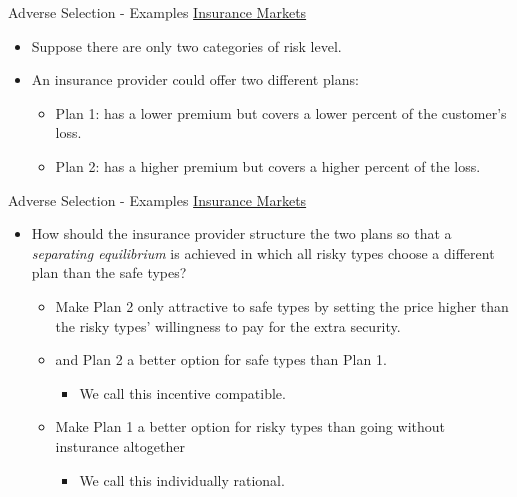 \begin{frame}{Adverse Selection - Examples}
  \underline{\Large{Insurance Markets}}
  \begin{itemize}
    \item Suppose there are only two categories of risk level.
    \item An insurance provider could offer two different plans:
    \begin{itemize}
      \item Plan 1: has a lower premium
      but covers a lower percent of the customer's loss.
      \item Plan 2: has a higher premium 
      but covers a higher percent of the loss.
    \end{itemize}
  \end{itemize}
\end{frame}


\begin{frame}{Adverse Selection - Examples}
  \underline{\Large{Insurance Markets}}
  \begin{itemize}
    \item How should the insurance provider structure the two plans 
    so that a \textit{separating equilibrium} is achieved 
    in which all risky types choose a different plan than the safe types?
    \begin{itemize}
      \item Make Plan 2 only attractive to safe types by setting the price higher than the risky types' willingness to pay for the extra security.
      \item and Plan 2 a better option for safe types than Plan 1.
      \begin{itemize}
        \item We call this \alert{incentive compatible}.
      \end{itemize}
      \item Make Plan 1 a better option for risky types than going without insturance altogether
      \begin{itemize}
        \item We call this \alert{individually rational}.
      \end{itemize}
    \end{itemize}
  \end{itemize}
\end{frame}


